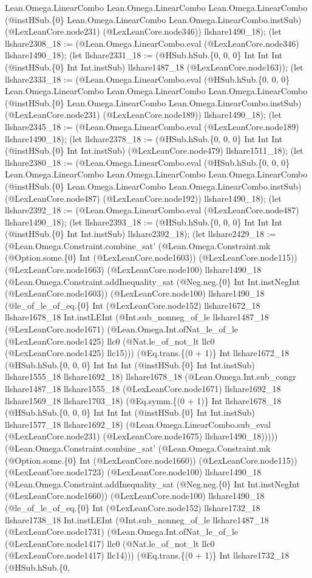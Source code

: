 \documentclass[11pt]{article}
\begin{document}
Lean.Omega.LinearCombo Lean.Omega.LinearCombo Lean.Omega.LinearCombo (@instHSub.\{0\} Lean.Omega.LinearCombo Lean.Omega.LinearCombo.instSub) (@LexLeanCore.node231) (@LexLeanCore.node346)) llshare1490\_18); (let llshare2308\_18 := (@Lean.Omega.LinearCombo.eval (@LexLeanCore.node346) llshare1490\_18); (let llshare2331\_18 := (@HSub.hSub.\{0, 0, 0\} Int Int Int (@instHSub.\{0\} Int Int.instSub) llshare1487\_18 (@LexLeanCore.node163)); (let llshare2333\_18 := (@Lean.Omega.LinearCombo.eval (@HSub.hSub.\{0, 0, 0\} Lean.Omega.LinearCombo Lean.Omega.LinearCombo Lean.Omega.LinearCombo (@instHSub.\{0\} Lean.Omega.LinearCombo Lean.Omega.LinearCombo.instSub) (@LexLeanCore.node231) (@LexLeanCore.node189)) llshare1490\_18); (let llshare2345\_18 := (@Lean.Omega.LinearCombo.eval (@LexLeanCore.node189) llshare1490\_18); (let llshare2378\_18 := (@HSub.hSub.\{0, 0, 0\} Int Int Int (@instHSub.\{0\} Int Int.instSub) (@LexLeanCore.node479) llshare1511\_18); (let llshare2380\_18 := (@Lean.Omega.LinearCombo.eval (@HSub.hSub.\{0, 0, 0\} Lean.Omega.LinearCombo Lean.Omega.LinearCombo Lean.Omega.LinearCombo (@instHSub.\{0\} Lean.Omega.LinearCombo Lean.Omega.LinearCombo.instSub) (@LexLeanCore.node487) (@LexLeanCore.node192)) llshare1490\_18); (let llshare2392\_18 := (@Lean.Omega.LinearCombo.eval (@LexLeanCore.node487) llshare1490\_18); (let llshare2393\_18 := (@HSub.hSub.\{0, 0, 0\} Int Int Int (@instHSub.\{0\} Int Int.instSub) llshare2392\_18); (let llshare2429\_18 := (@Lean.Omega.Constraint.combine\_sat' (@Lean.Omega.Constraint.mk (@Option.some.\{0\} Int (@LexLeanCore.node1603)) (@LexLeanCore.node115)) (@LexLeanCore.node1663) (@LexLeanCore.node100) llshare1490\_18 (@Lean.Omega.Constraint.addInequality\_sat (@Neg.neg.\{0\} Int Int.instNegInt (@LexLeanCore.node1603)) (@LexLeanCore.node100) llshare1490\_18 (@le\_of\_le\_of\_eq.\{0\} Int (@LexLeanCore.node152) llshare1672\_18 llshare1678\_18 Int.instLEInt (@Int.sub\_nonneg\_of\_le llshare1487\_18 (@LexLeanCore.node1671) (@Lean.Omega.Int.ofNat\_le\_of\_le (@LexLeanCore.node1425) llc0 (@Nat.le\_of\_not\_lt llc0 (@LexLeanCore.node1425) llc15))) (@Eq.trans.\{(0 + 1)\} Int llshare1672\_18 (@HSub.hSub.\{0, 0, 0\} Int Int Int (@instHSub.\{0\} Int Int.instSub) llshare1555\_18 llshare1692\_18) llshare1678\_18 (@Lean.Omega.Int.sub\_congr llshare1487\_18 llshare1555\_18 (@LexLeanCore.node1671) llshare1692\_18 llshare1569\_18 llshare1703\_18) (@Eq.symm.\{(0 + 1)\} Int llshare1678\_18 (@HSub.hSub.\{0, 0, 0\} Int Int Int (@instHSub.\{0\} Int Int.instSub) llshare1577\_18 llshare1692\_18) (@Lean.Omega.LinearCombo.sub\_eval (@LexLeanCore.node231) (@LexLeanCore.node1675) llshare1490\_18))))) (@Lean.Omega.Constraint.combine\_sat' (@Lean.Omega.Constraint.mk (@Option.some.\{0\} Int (@LexLeanCore.node1660)) (@LexLeanCore.node115)) (@LexLeanCore.node1723) (@LexLeanCore.node100) llshare1490\_18 (@Lean.Omega.Constraint.addInequality\_sat (@Neg.neg.\{0\} Int Int.instNegInt (@LexLeanCore.node1660)) (@LexLeanCore.node100) llshare1490\_18 (@le\_of\_le\_of\_eq.\{0\} Int (@LexLeanCore.node152) llshare1732\_18 llshare1738\_18 Int.instLEInt (@Int.sub\_nonneg\_of\_le llshare1487\_18 (@LexLeanCore.node1731) (@Lean.Omega.Int.ofNat\_le\_of\_le (@LexLeanCore.node1417) llc0 (@Nat.le\_of\_not\_lt llc0 (@LexLeanCore.node1417) llc14))) (@Eq.trans.\{(0 + 1)\} Int llshare1732\_18 (@HSub.hSub.\{0, 
\end{document}

